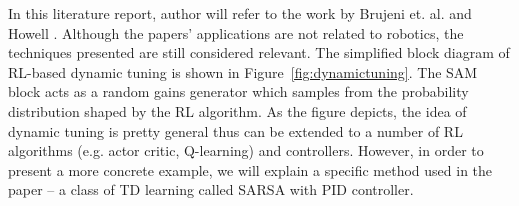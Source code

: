 In this literature report, author will refer to the work by Brujeni et. al. \cite{Brujeni5669655} and Howell \cite{856947}. Although the papers' applications are not related to robotics, the techniques presented are still considered relevant. The simplified block diagram of \acs{RL}-based dynamic tuning is shown in Figure~\ref{fig:dynamictuning}. The \ac {SAM} block acts as a random gains generator which samples from the probability distribution shaped by the \acs {RL} algorithm. As the figure depicts, the idea of dynamic tuning is pretty general thus can be extended to a number of \acs {RL} algorithms (e.g. actor critic, Q-learning) and controllers. However, in order to present a more concrete example, we will explain a specific method used in the paper -- a class of \acs {TD} learning called \ac{SARSA} with \acs{PID} controller. 

